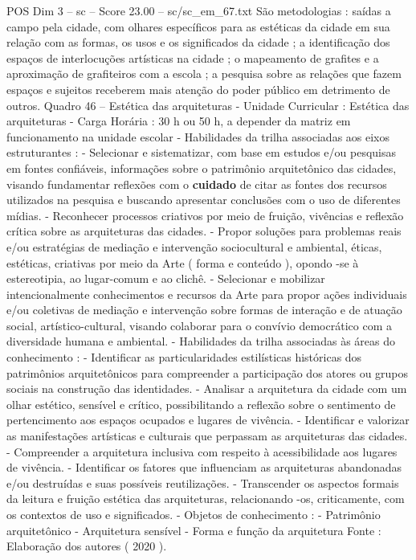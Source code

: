 \begin{textsample}{POS Dim 3 – sc – Score 23.00 – sc/sc\_em\_67.txt}
São metodologias : saídas a campo pela cidade, com olhares específicos para as estéticas da cidade em sua relação com as formas, os usos e os significados da cidade ; a identificação dos espaços de interlocuções artísticas na cidade ; o mapeamento de grafites e a aproximação de grafiteiros com a escola ; a pesquisa sobre as relações que fazem espaços e sujeitos receberem mais atenção do poder público em detrimento de outros.
Quadro 46 – Estética das arquiteturas - Unidade Curricular : Estética das arquiteturas - Carga Horária : 30 h ou 50 h, a depender da matriz em funcionamento na unidade escolar - Habilidades da trilha associadas aos eixos estruturantes : - Selecionar e sistematizar, com base em estudos e/ou pesquisas em fontes confiáveis, informações sobre o patrimônio arquitetônico das cidades, visando fundamentar reflexões com o \textbf{cuidado} de citar as fontes dos recursos utilizados na pesquisa e buscando apresentar conclusões com o uso de diferentes mídias. - Reconhecer processos criativos por meio de fruição, vivências e reflexão crítica sobre as arquiteturas das cidades. - Propor soluções para problemas reais e/ou estratégias de mediação e intervenção sociocultural e ambiental, éticas, estéticas, criativas por meio da Arte ( forma e conteúdo ), opondo -se à estereotipia, ao lugar-comum e ao clichê. - Selecionar e mobilizar intencionalmente conhecimentos e recursos da Arte para propor ações individuais e/ou coletivas de mediação e intervenção sobre formas de interação e de atuação social, artístico-cultural, visando colaborar para o convívio democrático com a diversidade humana e ambiental. - Habilidades da trilha associadas às áreas do conhecimento : - Identificar as particularidades estilísticas históricas dos patrimônios arquitetônicos para compreender a participação dos atores ou grupos sociais na construção das identidades. - Analisar a arquitetura da cidade com um olhar estético, sensível e crítico, possibilitando a reflexão sobre o sentimento de pertencimento aos espaços ocupados e lugares de vivência. - Identificar e valorizar as manifestações artísticas e culturais que perpassam as arquiteturas das cidades. - Compreender a arquitetura inclusiva com respeito à acessibilidade aos lugares de vivência. - Identificar os fatores que influenciam as arquiteturas abandonadas e/ou destruídas e suas possíveis reutilizações. - Transcender os aspectos formais da leitura e fruição estética das arquiteturas, relacionando -os, criticamente, com os contextos de uso e significados. - Objetos de conhecimento : - Patrimônio arquitetônico - Arquitetura sensível - Forma e função da arquitetura Fonte : Elaboração dos autores ( 2020 ).

\end{textsample}
